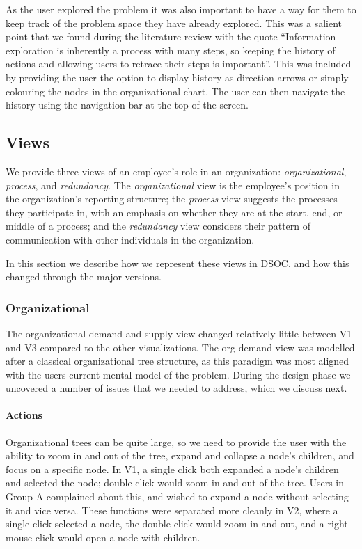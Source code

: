 \documentclass[journal]{vgtc}                %
\begin{document}
As the user explored the problem it was also important to have a way for them to keep track of the problem space they have already explored.  This was a salient point that we found during the literature review with the quote ``Information exploration is inherently a process with many steps, so keeping the history of actions and allowing users to retrace their steps is important''\cite{anafigueiras}.  This was included by providing the user the option to display history as direction arrows or simply colouring the nodes in the organizational chart.  The user can then navigate the history using the navigation bar at the top of the screen.

\subsection{Views}
We provide three views of an employee's role in an organization: \emph{organizational}, \emph{process}, and \emph{redundancy}. The \emph{organizational} view is the employee's position in the organization's reporting structure; the \emph{process} view suggests the processes they participate in, with an emphasis on whether they are at the start, end, or middle of a process; and the \emph{redundancy} view considers their pattern of communication with other individuals in the organization.

In this section we describe how we represent these views in DSOC, and how this changed through the major versions.

\subsubsection{Organizational}
The organizational demand and supply view changed relatively little between V1 and V3 compared to the other visualizations.  The org-demand view was modelled after a classical organizational tree structure, as this paradigm was most aligned with the users current mental model of the problem.  During the design phase we uncovered a number of issues that we needed to address, which we discuss next.

\paragraph{Actions}
Organizational trees can be quite large, so we need to provide the user with the ability to zoom in and out of the tree, expand and collapse a node's children, and focus on a specific node.  In V1, a single click both expanded a node's children and selected the node; double-click would zoom in and out of the tree.  Users in Group A complained about this, and wished to expand a node without selecting it and vice versa. These functions were separated more cleanly in V2, where a single click selected a node, the double click would zoom in and out, and a right mouse click would open a node with children.
\end{document}
